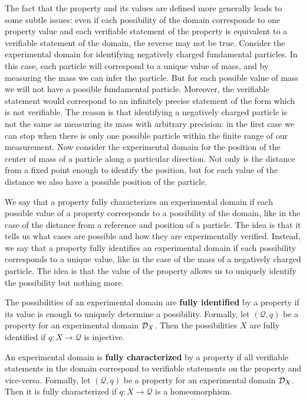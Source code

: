 \documentclass[11pt,letterpaper,fleqn]{memoir} %
\begin{document}
The fact that the property and its values are defined more generally leads to some subtle issues: even if each possibility of the domain corresponds to one property value and each verifiable statement of the property is equivalent to a verifiable statement of the domain, the reverse may not be true. Consider the experimental domain for identifying negatively charged fundamental particles. In this case, each particle will correspond to a unique value of mass, and by measuring the mass we can infer the particle. But for each possible value of mass we will not have a possible fundamental particle. Moreover, the verifiable statement  would correspond to an infinitely precise statement of the form  which is not verifiable. The reason is that identifying a negatively charged particle is not the same as measuring its mass with arbitrary precision: in the first case we can stop when there is only one possible particle within the finite range of our measurement. Now consider the experimental domain for the position of the center of mass of a particle along a particular direction. Not only is the distance from a fixed point enough to identify the position, but for each value of the distance we also have a possible position of the particle.

We say that a property fully characterizes an experimental domain if each possible value of a property corresponds to a possibility of the domain, like in the case of the distance from a reference and position of a particle. The idea is that it tells us what cases are possible and how they are experimentally verified. Instead, we say that a property fully identifies an experimental domain if each possibility corresponds to a unique value, like in the case of the mass of a negatively charged particle. The idea is that the value of the property allows us to uniquely identify the possibility but nothing more.

\begin{mathSection}
	\begin{defn}
		The possibilities of an experimental domain are \textbf{fully identified} by a property if its value is enough to uniquely determine a possibility. Formally, let $(\mathcal{Q}, q)$ be a property for an experimental domain $\mathcal{D}_X$. Then the possibilities $X$ are fully identified if $q: X \to \mathcal{Q}$ is injective.
	\end{defn}
	
	\begin{defn}
		An experimental domain is \textbf{fully characterized} by a property if all verifiable statements in the domain correspond to verifiable statements on the property and vice-versa. Formally, let $(\mathcal{Q}, q)$ be a property for an experimental domain $\mathcal{D}_X$. Then it is fully characterized if $q: X \to \mathcal{Q}$ is a homeomorphism.
	\end{defn}
\end{mathSection}
\end{document}
